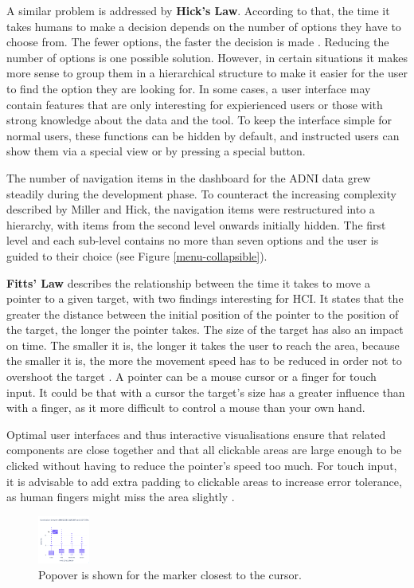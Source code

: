 \documentclass[11pt]{article}
\begin{document}
A similar problem is addressed by \textbf{Hick's Law}. According to that, the time it takes humans to make a decision depends on the number of options they have to choose from. The fewer options, the faster the decision is made \parencite{soegaard_hicks_2020}. Reducing the number of options is one possible solution. However, in certain situations it makes more sense to group them in a hierarchical structure to make it easier for the user to find the option they are looking for. In some cases, a user interface may contain features that are only interesting for expierienced users or those with strong knowledge about the data and the tool. To keep the interface simple for normal users, these functions can be hidden by default, and instructed users can show them via a special view or by pressing a special button.

The number of navigation items in the dashboard for the ADNI data grew steadily during the development phase. To counteract the increasing complexity described by Miller and Hick, the navigation items were restructured into a hierarchy, with items from the second level onwards initially hidden. The first level and each sub-level contains no more than seven options and the user is guided to their choice (see Figure \ref{menu-collapsible}).

\textbf{Fitts' Law} describes the relationship between the time it takes to move a pointer to a given target, with two findings interesting for HCI. It states that the greater the distance between the initial position of the pointer to the position of the target, the longer the pointer takes. The size of the target has also an impact on time. The smaller it is, the longer it takes the user to reach the area, because the smaller it is, the more the movement speed has to be reduced in order not to overshoot the target \parencite{budiu_fittss_2022}. A pointer can be a mouse cursor or a finger for touch input. It could be that with a cursor the target's size has a greater influence than with a finger, as it more difficult to control a mouse than your own hand.

Optimal user interfaces and thus interactive visualisations ensure that related components are close together and that all clickable areas are large enough to be clicked without having to reduce the pointer's speed too much. For touch input, it is advisable to add extra padding to clickable areas to increase error tolerance, as human fingers might miss the area slightly \parencite{hoober_fitts_2022}.

\begin{figure}
    \includegraphics[width=0.15\textwidth]{./fitts-cursor.png}
    \caption{Popover is shown for the marker closest to the cursor.}
    \label{fitts-cursor}
\end{figure}
\end{document}
